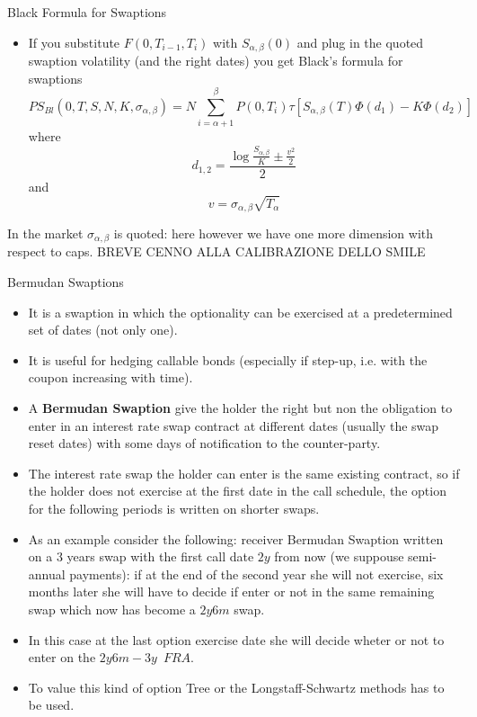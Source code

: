 \documentclass{beamer}
\begin{document}
\begin{frame}{Black Formula for Swaptions}
	\begin{itemize}
		\item If you substitute $F(0, T_{i-1}, T_i)$ with $S_{\alpha,\beta}(0)$ and plug in the quoted swaption volatility (and the right dates) you get Black's formula for swaptions
		\begin{equation}
			PS_{Bl}(0, T,S,N,K,\sigma_{\alpha,\beta})=N\sum_{i=\alpha+1}^\beta P(0,T_i)\tau\left[S_{\alpha,\beta}(T)\Phi(d_1)-K\Phi(d_2)\right]
		\end{equation}
		where
		\begin{equation}
			d_{1,2} = \frac{\log{\frac{S_{\alpha,\beta}}{K}} \pm \frac{v^2}{2}}{2}
		\end{equation}
		and
		\begin{equation}
			v = \sigma_{\alpha,\beta}\sqrt{T_\alpha}
		\end{equation}
	\end{itemize}
	In the market $\sigma_{\alpha,\beta}$ is quoted: here however we have one more dimension with respect to caps.
	BREVE CENNO ALLA CALIBRAZIONE DELLO SMILE
\end{frame}

\begin{frame}{Bermudan Swaptions}
	\begin{itemize}
		\item It is a swaption in which the optionality can be exercised at a predetermined set of dates (not only one).
		\item It is useful for hedging callable bonds (especially if step-up, i.e. with the coupon increasing with time).
		\item A \textbf{Bermudan Swaption} give the holder the right but non the obligation to enter in an interest rate swap contract at different dates (usually the swap reset dates) with some days of notification to the counter-party.
		\item The interest rate swap the holder can enter is the same existing contract, so if the holder does not exercise at the first date in the call schedule, the option for the following periods is written on shorter swaps.
		\item As an example consider the following: receiver Bermudan Swaption written on a 3 years swap with the first call date $2y$ from now (we suppouse semi-annual payments): if at the end of the second year she will not exercise, six months later she will have to decide if enter or not in the same remaining swap which now has become a $2y6m$ swap.
		\item In this case at the last option exercise date she will decide wheter or not to enter on the $2y6m-3y$~$FRA$.
		\item To value this kind of option Tree or the Longstaff-Schwartz methods has to be used.
	\end{itemize}
\end{frame}
\end{document}
